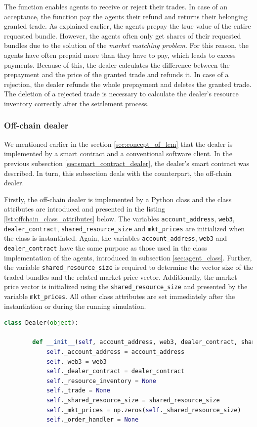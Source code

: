 The function enables agents to receive or reject their trades. 
In case of an acceptance, the function pay the agents their refund
and returns their belonging granted trade.
As explained earlier, the agents prepay the true value of the entire requested bundle.
However, the agents often only get shares of their requested bundles due to the solution of the 
\textit{market matching problem}.
For this reason, the agents have often prepaid more than they have to pay, which leads to 
excess payments. Because of this, the dealer calculates the difference between the prepayment 
and the price of the granted trade and refunds it.
In case of a rejection, the dealer refunds the whole prepayment and deletes the granted trade.
The deletion of a rejected trade is necessary to calculate the dealer's resource inventory correctly
after the settlement process.


\subsubsection{Off-chain dealer}
\label{sec:off_chain_component}
We mentioned earlier in the section \ref{sec:concept_of_lem} that the 
dealer is implemented by a smart contract and a conventional software client.
In the previous subsection \ref{sec:smart_contract_dealer}, the 
dealer's smart contract was described. In turn, 
this subsection deals with the counterpart, the off-chain dealer. 

Firstly, the off-chain dealer is implemented by a Python class and the 
class attributes are introduced and presented in the listing \ref{lst:offchain_class_attributes} below.
The variables \verb|account_address|, \verb|web3|, 
\verb|dealer_contract|, \verb|shared_resource_size| and \verb|mkt_prices| 
are initialized when the class is instantiated.
Again, the variables \verb|account_address|, \verb|web3| and 
\verb|dealer_contract| have the same purpose as those used in the class implementation of 
the agents, introduced in subsection \ref{sec:agent_class}.
Further, the variable \verb|shared_resource_size| is required to determine the vector size 
of the traded bundles and the related market price vector. 
Additionally, the market price vector is initialized using the \verb|shared_resource_size|
and presented by the variable \verb|mkt_prices|.
All other class attributes are set immediately after 
the instantiation or during the running simulation.

\begin{lstlisting}[float=htbp, label=lst:offchain_class_attributes, caption=Overview of the off-chain dealer's class attributes, language=Python]
    class Dealer(object):

        def __init__(self, account_address, web3, dealer_contract, shared_resource_size):
            self._account_address = account_address
            self._web3 = web3
            self._dealer_contract = dealer_contract
            self._resource_inventory = None
            self._trade = None
            self._shared_resource_size = shared_resource_size
            self._mkt_prices = np.zeros(self._shared_resource_size)
            self._order_handler = None
\end{lstlisting}


